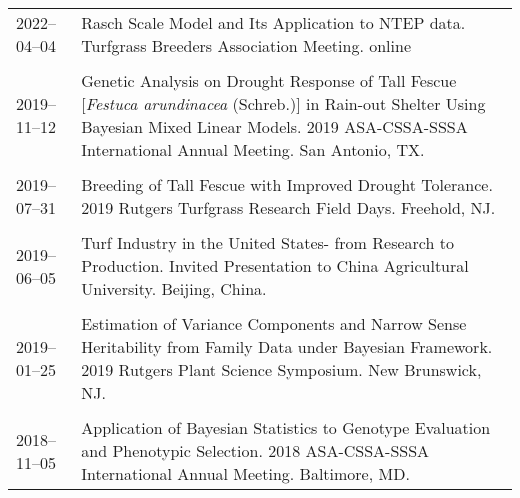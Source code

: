\documentclass[letterpaper,11pt, english]{article}
\begin{document}
\begin{flushleft}
    \begin{tabularx}{\textwidth}{@{}lX@{}}
    2022--04--04 \hspace{1cm} & Rasch Scale Model and Its Application to NTEP data. Turfgrass Breeders Association Meeting. online \\
    \\[-0.2cm]
    2019--11--12 \hspace{1cm} & Genetic Analysis on Drought Response of Tall Fescue [\textit{Festuca arundinacea} (Schreb.)] in Rain-out Shelter Using Bayesian Mixed Linear Models. 2019 ASA-CSSA-SSSA International Annual Meeting. San Antonio, TX. \\
      \\[-0.2cm]
    2019--07--31 \hspace{1cm} & Breeding of Tall Fescue with Improved Drought Tolerance. 2019 Rutgers Turfgrass Research Field Days. Freehold, NJ. \\
    \\[-0.2cm]
    2019--06--05 \hspace{1cm} & Turf Industry in the United States- from Research to Production. Invited Presentation to China Agricultural University. Beijing, China. \\
    \\[-0.2cm]
    2019--01--25 \hspace{1cm} & Estimation of Variance Components and Narrow Sense Heritability from Family Data under Bayesian Framework. 2019 Rutgers Plant Science Symposium. New Brunswick, NJ. \\
    \\[-0.2cm]
    2018--11--05 \hspace{1cm} & Application of Bayesian Statistics to Genotype Evaluation and Phenotypic Selection. 2018 ASA-CSSA-SSSA International Annual Meeting. Baltimore, MD. \\
  \end{tabularx}
\end{flushleft}
\end{document}
